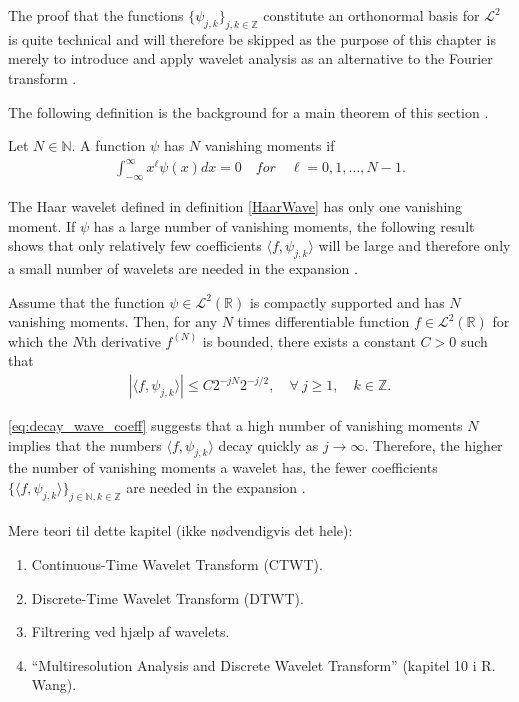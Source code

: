 The proof that the functions $\{\psi_{j,k}\}_{j,k\in\mathbb{Z}}$ constitute an orthonormal basis for $\mathcal{L}^2$ is quite technical and will therefore be skipped as the purpose of this chapter is merely to introduce and apply wavelet analysis as an alternative to the Fourier transform \cite{page 161, FSE2010} .

The following definition is the background for a main theorem of this section \cite{page 170, FSE2010}.

\begin{definition}
Let $N \in \mathbb{N}$. A function $\psi$ has $N$ vanishing moments if
\begin{align*}
\int_{-\infty}^\infty x^\ell \psi(x) dx = 0 \quad for \quad \ell = 0, 1, \dots, N-1.
\end{align*}
\end{definition}

The Haar wavelet defined in definition \ref{HaarWave} has only one vanishing moment. If $\psi$ has a large number of vanishing moments, the following result shows that only relatively few coefficients $\langle f, \psi_{j,k} \rangle$ will be large and therefore only a small number of wavelets are needed in the expansion .

\begin{theorem}
Assume that the function $\psi \in \mathcal{L}^2(\mathbb{R})$ is compactly supported and has $N$ vanishing moments. Then, for any $N$ times differentiable function $f \in \mathcal{L}^2(\mathbb{R})$ for which the $N$th derivative $f^{(N)}$ is bounded, there exists a constant $C > 0$ such that
\begin{align} \label{eq:decay_wave_coeff}
|\langle f, \psi_{j,k} \rangle| \leq C 2^{-jN} 2^{-j/2}, \quad \forall \ j \geq 1, \quad k \in \mathbb{Z}.
\end{align}
\end{theorem}

\eqref{eq:decay_wave_coeff} suggests that a high number of vanishing moments $N$ implies that the numbers $\langle f, \psi_{j,k} \rangle$ decay quickly as $j \to \infty$. Therefore, the higher the number of vanishing moments a wavelet has, the fewer coefficients $\{ \langle f, \psi_{j,k} \rangle \}_{j\in\mathbb{N},k\in\mathbb{Z}}$ are needed in the expansion \cite{page 170, FSE2010}.
\\ \\
Mere teori til dette kapitel (ikke nødvendigvis det hele):
\begin{enumerate}
\item Continuous-Time Wavelet Transform (CTWT).
\item Discrete-Time Wavelet Transform (DTWT).
\item Filtrering ved hjælp af wavelets.
\item ``Multiresolution Analysis and Discrete Wavelet Transform'' (kapitel 10 i R. Wang).
\end{enumerate}